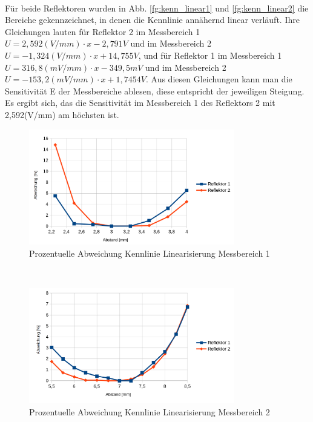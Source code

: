 ~\\
Für beide Reflektoren wurden in Abb. \ref{fg:kenn_linear1} und \ref{fg:kenn_linear2} die Bereiche gekennzeichnet, in denen die Kennlinie annähernd linear verläuft. Ihre Gleichungen lauten für Reflektor 2 im Messbereich 1 $U = 2,592(V/mm) \cdot x - 2,791V$ und im Messbereich 2 $U = -1,324(V/mm) \cdot x + 14,755V$, und für Reflektor 1 im Messbereich 1 $U = 316,8(mV/mm) \cdot x - 349,5mV$ und im Messbereich 2 $U = -153,2(mV/mm) \cdot x + 1,7454V$. Aus diesen Gleichungen kann man die Sensitivität E der Messbereiche ablesen, diese entspricht der jeweiligen Steigung. Es ergibt sich, das die Sensitivität im Messbereich 1 des Reflektors 2 mit 2,592(V/mm) am höchsten ist.
\begin{figure}[h]
	\centering
	\includegraphics[width=0.8\textwidth]{./img/ch6/Prozentuelle_Abweichung_Kennlinie_Linearisierung_Messbereich_1}
	\caption{Prozentuelle Abweichung Kennlinie Linearisierung Messbereich 1}
	\label{fg:kenn_mb1}
\end{figure}
~\\
\begin{figure}[h]
	\centering
	\includegraphics[width=0.8\textwidth]{./img/ch6/Prozentuelle_Abweichung_Kennlinie_Linearisierung_Messbereich_2}
	\caption{Prozentuelle Abweichung Kennlinie Linearisierung Messbereich 2}
	\label{fg:kenn_mb2}
\end{figure}
